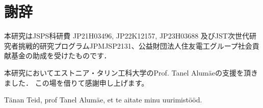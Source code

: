 \chapter*{謝辞}

本研究はJSPS科研費 JP21H03496, JP22K12157, JP23H03688 及びJST次世代研究者挑戦的研究プログラムJPMJSP2131、公益財団法人住友電工グループ社会貢献基金の助成を受けたものです．

本研究においてエストニア・タリン工科大学のProf. Tanel Alumäeの支援を頂きました．
この場を借りて感謝申し上げます。

Tänan Teid, prof Tanel Alumäe, et te aitate minu uurimistööd.
